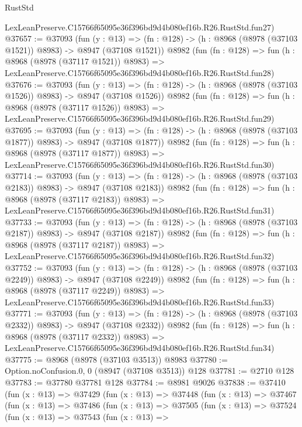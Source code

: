 \begin{lexlean}{RustStd}
\begin{coremodule}
    LexLeanPreserve.C15766f65095e36f396bd9d4b080ef16b.R26.RustStd.fun27)
@37657 := @37093
    (fun (y : @13) =>
    (fn : @128) -> (h : @8968 (@8978 (@37103 @1521)) @8983) -> @8947 (@37108 @1521))
    @8982
    (fun (fn : @128) =>
    fun (h : @8968 (@8978 (@37117 @1521)) @8983) =>
    LexLeanPreserve.C15766f65095e36f396bd9d4b080ef16b.R26.RustStd.fun28)
@37676 := @37093
    (fun (y : @13) =>
    (fn : @128) -> (h : @8968 (@8978 (@37103 @1526)) @8983) -> @8947 (@37108 @1526))
    @8982
    (fun (fn : @128) =>
    fun (h : @8968 (@8978 (@37117 @1526)) @8983) =>
    LexLeanPreserve.C15766f65095e36f396bd9d4b080ef16b.R26.RustStd.fun29)
@37695 := @37093
    (fun (y : @13) =>
    (fn : @128) -> (h : @8968 (@8978 (@37103 @1877)) @8983) -> @8947 (@37108 @1877))
    @8982
    (fun (fn : @128) =>
    fun (h : @8968 (@8978 (@37117 @1877)) @8983) =>
    LexLeanPreserve.C15766f65095e36f396bd9d4b080ef16b.R26.RustStd.fun30)
@37714 := @37093
    (fun (y : @13) =>
    (fn : @128) -> (h : @8968 (@8978 (@37103 @2183)) @8983) -> @8947 (@37108 @2183))
    @8982
    (fun (fn : @128) =>
    fun (h : @8968 (@8978 (@37117 @2183)) @8983) =>
    LexLeanPreserve.C15766f65095e36f396bd9d4b080ef16b.R26.RustStd.fun31)
@37733 := @37093
    (fun (y : @13) =>
    (fn : @128) -> (h : @8968 (@8978 (@37103 @2187)) @8983) -> @8947 (@37108 @2187))
    @8982
    (fun (fn : @128) =>
    fun (h : @8968 (@8978 (@37117 @2187)) @8983) =>
    LexLeanPreserve.C15766f65095e36f396bd9d4b080ef16b.R26.RustStd.fun32)
@37752 := @37093
    (fun (y : @13) =>
    (fn : @128) -> (h : @8968 (@8978 (@37103 @2249)) @8983) -> @8947 (@37108 @2249))
    @8982
    (fun (fn : @128) =>
    fun (h : @8968 (@8978 (@37117 @2249)) @8983) =>
    LexLeanPreserve.C15766f65095e36f396bd9d4b080ef16b.R26.RustStd.fun33)
@37771 := @37093
    (fun (y : @13) =>
    (fn : @128) -> (h : @8968 (@8978 (@37103 @2332)) @8983) -> @8947 (@37108 @2332))
    @8982
    (fun (fn : @128) =>
    fun (h : @8968 (@8978 (@37117 @2332)) @8983) =>
    LexLeanPreserve.C15766f65095e36f396bd9d4b080ef16b.R26.RustStd.fun34)
@37775 := @8968 (@8978 (@37103 @3513)) @8983
@37780 := Option.noConfusion.{0, 0} (@8947 (@37108 @3513)) @128
@37781 := @2710 @128
@37783 := @37780 @37781 @128
@37784 := @8981 @9026
@37838 := @37410
    (fun (x : @13) =>
    @37429
      (fun (x : @13) =>
      @37448
        (fun (x : @13) =>
        @37467
          (fun (x : @13) =>
          @37486
            (fun (x : @13) =>
            @37505
              (fun (x : @13) =>
              @37524
                (fun (x : @13) =>
                @37543
                  (fun (x : @13) =>

\end{coremodule}
\end{lexlean}
